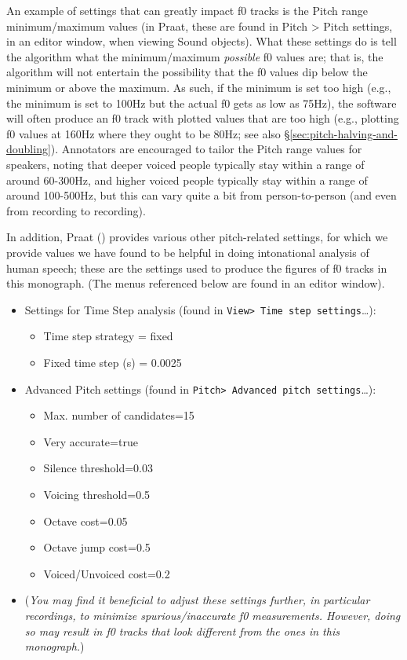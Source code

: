 An example of settings that can greatly impact f0 tracks is the Pitch range minimum\slash maximum values (in Praat, these are found in Pitch > Pitch settings, in an editor window, when viewing Sound objects). What these settings do is tell the algorithm what the minimum\slash maximum \emph{possible} f0 values are; that is, the algorithm will not entertain the possibility that the f0 values dip below the minimum or above the maximum. As such, if the minimum is set too high (e.g., the minimum is set to 100Hz but the actual f0 gets as low as 75Hz), the software will often produce an f0 track with plotted values that are too high (e.g., plotting f0 values at 160Hz where they ought to be 80Hz; see also §\ref{sec:pitch-halving-and-doubling}). Annotators are encouraged to tailor the Pitch range values for speakers, noting that deeper voiced people typically stay within a range of around 60-300Hz, and higher voiced people typically stay within a range of around 100-500Hz, but this can vary quite a bit from person-to-person (and even from recording to recording).

In addition, Praat (\citealt{praat}) provides various other pitch-related settings, for which we provide values we have found to be helpful in doing intonational analysis of human speech; these are the settings used to produce the figures of f0 tracks in this monograph. (The menus referenced below are found in an editor window).

\begin{itemize}
\item Settings for Time Step analysis (found in \texttt{View> Time step settings}\ldots):
	\begin{itemize}
		\item Time step strategy = fixed
		\item Fixed time step (s) = 0.0025
	\end{itemize} 
\item Advanced Pitch settings (found in \texttt{Pitch> Advanced pitch settings}\ldots):
	\begin{itemize}
		\item Max. number of candidates=15
		\item Very accurate=true
		\item Silence threshold=0.03
		\item Voicing threshold=0.5
		\item Octave cost=0.05
		\item Octave jump cost=0.5
		\item Voiced/Unvoiced cost=0.2
	\end{itemize}
\item[] (\textit{You may find it beneficial to adjust these settings further, in particular recordings, to minimize spurious\slash inaccurate f0 measurements. However, doing so may result in f0 tracks that look different from the ones in this monograph.})
\end{itemize}

